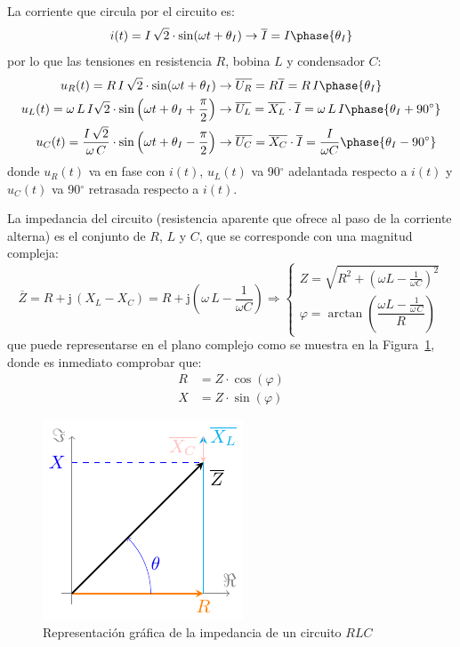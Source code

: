 La corriente que circula por el circuito es:
\begin{equation*}
  i(t)=I\,\sqrt{2}\cdot\sin(\omega t+\theta_I)\rightarrow\overline{I}=I\phase{\theta_I}
\end{equation*}
por lo que las tensiones en resistencia $R$, bobina $L$ y condensador
$C$:
\begin{align*}
  u_R(t)=R\, I\,\sqrt{2}\cdot\sin(\omega t+\theta_I)&\rightarrow \overline{U_R} = R \overline{I}=R\,I\phase{\theta_I}\\ 
  u_L(t)= \omega\,L\,I \sqrt{2}\cdot \sin \left(\omega t+\theta_I+\frac{\pi}{2}\right)&\rightarrow \overline{U_L}=\overline{X_L}\cdot\overline{I}= \omega\,L\,I\phase{\theta_I+90^\circ}\\
  u_C(t)=\dfrac{I\,\sqrt{2}}{\omega\,C} \cdot \sin \left(\omega t+\theta_I-\frac{\pi}{2}\right)&\rightarrow \overline{U_C}=\overline{X_C}\cdot\overline{I}=\dfrac{I}{\omega C}\phase{\theta_I-90^\circ}
\end{align*}
donde $u_R(t)$ va en fase con $i(t)$, $u_L(t)$ va 90$^\circ$
adelantada respecto a $i(t)$ y $u_C(t)$ va 90$^\circ$ retrasada
respecto a $i(t)$.
	
La impedancia del circuito (resistencia aparente que ofrece al paso de
la corriente alterna) es el conjunto de $R$, $L$ y $C$, que se
corresponde con una magnitud compleja:
\begin{equation}
  \boxed{ \overline{Z} = R + \mathrm{j}\,(X_L-X_C) = R+ \mathrm{j}\left(\omega\,L-\dfrac{1}{\omega C}\right) \Rightarrow 
    \begin{cases}
      Z=\sqrt{R^2+\left(\omega L -\frac{1}{\omega C} \right)^2}\\
      \varphi=\arctan\left(\dfrac{\omega L-\frac{1}{\omega\,C}}{R} \right)
    \end{cases}}
\end{equation}
que puede representarse en el plano complejo como se muestra en la
Figura~\ref{fig:fasorRLC}, donde es inmediato comprobar que:
\begin{align*}
  R&=Z\cdot\cos(\varphi)\\
  X&=Z\cdot\sin(\varphi)
\end{align*} 
\begin{figure}[H]
  \centering \includegraphics{../figs/fasorRLC.pdf}
  \caption{Representación gráfica de la impedancia de un circuito
    $RLC$}
  \label{fig:fasorRLC}
\end{figure}
	
